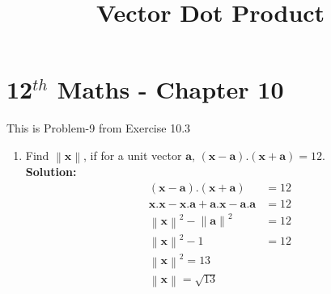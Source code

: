 \documentclass[12pt]{article}
\providecommand{\brak}[1]{\ensuremath{\left(#1\right)}}
\providecommand{\norm}[1]{\left\lVert#1\right\rVert}
\newcommand{\solution}{\noindent \textbf{Solution: }}
\let\vec\mathbf
\begin{document}
\begin{center}
\title{\textbf{Vector Dot Product}}
\date{\vspace{-5ex}} %
\maketitle
\end{center}
\setcounter{page}{1}

\section{12$^{th}$ Maths - Chapter 10}
This is Problem-9 from Exercise 10.3
\begin{enumerate}
\item Find $\norm{\vec{x}}$, if for a unit vector $\vec{a}$, $\brak{\vec{x}-\vec{a}}.\brak{\vec{x}+\vec{a}} = 12$.\\
\solution 
\begin{align*}
  \label{eq:det2f}
  \brak{\vec{x}-\vec{a}}.\brak{\vec{x}+\vec{a}} &= 12 \\
  \vec{x}.\vec{x} - \vec{x}.\vec{a} + \vec{a}.\vec{x} - \vec{a}.\vec{a} &= 12 \\
  \norm{\vec{x}}^{2} - \norm{\vec{a}}^{2} &= 12 \\
  \norm{\vec{x}}^{2} - 1 &= 12  \\
  \norm{\vec{x}}^{2} = 13 \\
  \norm{\vec{x}} = \sqrt{13}
\end{align*}
\end{enumerate}
\end{document}
